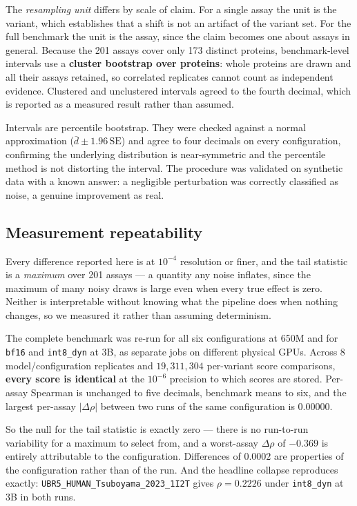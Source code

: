 \documentclass[11pt]{article}
\newcommand{\cfg}[1]{\texttt{#1}}
\begin{document}
The \emph{resampling unit} differs by scale of claim. For a single assay the
unit is the variant, which establishes that a shift is not an artifact of the
variant set. For the full benchmark the unit is the assay, since the claim
becomes one about assays in general. Because the 201 assays cover only 173
distinct proteins, benchmark-level intervals use a \textbf{cluster bootstrap
over proteins}: whole proteins are drawn and all their assays retained, so
correlated replicates cannot count as independent evidence. Clustered and
unclustered intervals agreed to the fourth decimal, which is reported as a
measured result rather than assumed.

Intervals are percentile bootstrap. They were checked against a normal
approximation ($\bar{d} \pm 1.96\,\mathrm{SE}$) and agree to four decimals on
every configuration, confirming the underlying distribution is near-symmetric
and the percentile method is not distorting the interval. The procedure was
validated on synthetic data with a known answer: a negligible perturbation was
correctly classified as noise, a genuine improvement as real.

\subsection{Measurement repeatability}
\label{sec:repeat}

Every difference reported here is at $10^{-4}$ resolution or finer, and the tail
statistic is a \emph{maximum} over 201 assays --- a quantity any noise inflates,
since the maximum of many noisy draws is large even when every true effect is
zero. Neither is interpretable without knowing what the pipeline does when
nothing changes, so we measured it rather than assuming determinism.

The complete benchmark was re-run for all six configurations at 650M and for
\cfg{bf16} and \cfg{int8\_dyn} at 3B, as separate jobs on different physical
GPUs. Across 8 model/configuration replicates and $19{,}311{,}304$ per-variant score
comparisons, \textbf{every score is identical} at the $10^{-6}$ precision to
which scores are stored. Per-assay Spearman is unchanged to five decimals,
benchmark means to six, and the largest per-assay $|\Delta\rho|$ between two
runs of the same configuration is $0.00000$.

So the null for the tail statistic is exactly zero --- there is no run-to-run
variability for a maximum to select from, and a worst-assay $\Delta\rho$ of
$-0.369$ is entirely attributable to the configuration. Differences of $0.0002$
are properties of the configuration rather than of the run. And the headline
collapse reproduces exactly: \texttt{UBR5\_HUMAN\_Tsuboyama\_2023\_1I2T} gives
$\rho = 0.2226$ under \cfg{int8\_dyn} at 3B in both runs.
\end{document}
